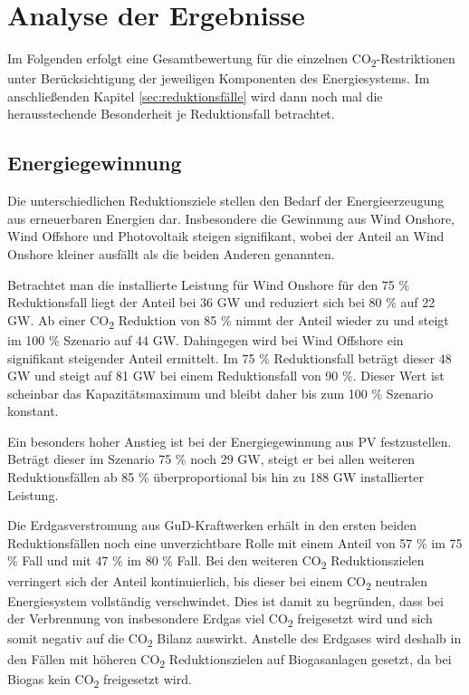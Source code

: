\section{Analyse der Ergebnisse}
Im Folgenden erfolgt eine Gesamtbewertung für die einzelnen CO\textsubscript{2}-Restriktionen unter Berücksichtigung der jeweiligen Komponenten des Energiesystems. Im anschließenden Kapitel \ref{sec:reduktionsfälle} wird dann noch mal die herausstechende Besonderheit je Reduktionsfall betrachtet. 

\subsection{Energiegewinnung}
Die unterschiedlichen Reduktionsziele stellen den Bedarf der Energieerzeugung aus erneuerbaren Energien dar. Insbesondere die Gewinnung aus Wind Onshore, Wind Offshore und Photovoltaik steigen signifikant, wobei der Anteil an Wind Onshore kleiner ausfällt als die beiden Anderen genannten. 

Betrachtet man die installierte Leistung für Wind Onshore für den 75 \% Reduktionsfall liegt der Anteil bei 36 GW und reduziert sich bei 80 \% auf 22 GW. Ab einer CO\textsubscript{2} Reduktion von 85 \% nimmt der Anteil wieder zu und steigt im 100 \% Szenario auf 44 GW. 
Dahingegen wird bei Wind Offshore ein signifikant steigender Anteil ermittelt. Im 75 \% Reduktionsfall beträgt dieser 48 GW und steigt auf 81 GW bei einem Reduktionsfall von 90 \%. Dieser Wert ist scheinbar das Kapazitätsmaximum und bleibt daher bis zum 100 \% Szenario konstant.

Ein besonders hoher Anstieg ist bei der Energiegewinnung aus PV festzustellen. Beträgt dieser im Szenario 75 \% noch 29 GW, steigt er bei allen weiteren Reduktionsfällen ab 85 \% überproportional bis hin zu 188 GW installierter Leistung.

Die Erdgasverstromung aus GuD-Kraftwerken erhält in den ersten beiden Reduktionsfällen noch eine unverzichtbare Rolle mit einem Anteil von 57 \% im 75 \% Fall und mit 47 \% im 80 \% Fall. Bei den weiteren CO\textsubscript{2} Reduktionszielen verringert sich der Anteil kontinuierlich, bis dieser bei einem CO\textsubscript{2} neutralen Energiesystem vollständig verschwindet. Dies ist damit zu begründen, dass bei der Verbrennung von insbesondere Erdgas viel CO\textsubscript{2} freigesetzt wird und sich somit negativ auf die CO\textsubscript{2} Bilanz auswirkt. Anstelle des Erdgases wird deshalb in den Fällen mit höheren CO\textsubscript{2} Reduktionszielen auf Biogasanlagen gesetzt, da bei Biogas kein CO\textsubscript{2} freigesetzt wird. 


